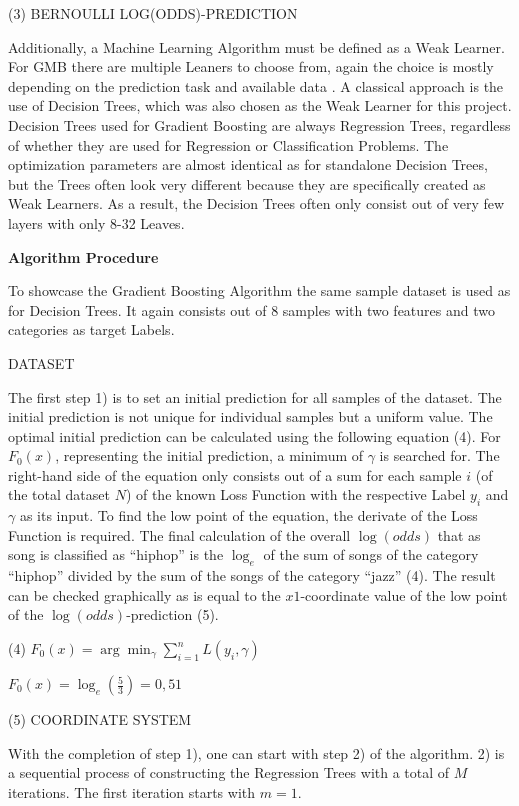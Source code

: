 (3) BERNOULLI LOG(ODDS)-PREDICTION 

Additionally, a Machine Learning Algorithm must be defined as a Weak Learner. For GMB there 
are multiple Leaners to choose from, again the choice is mostly depending on the prediction 
task and available data \cite[3.2]{Natekin2013}. A classical approach is the use of Decision Trees, which was also 
chosen as the Weak Learner for this project. Decision Trees used for Gradient Boosting are 
always Regression Trees, regardless of whether they are used for Regression or Classification 
Problems. The optimization parameters are almost identical as for standalone Decision Trees, 
but the Trees often look very different because they are specifically created as Weak Learners. 
As a result, the Decision Trees often only consist out of very few layers with only 8-32 Leaves.

\textbf{Algorithm Procedure}

To showcase the Gradient Boosting Algorithm the same sample dataset is used as for Decision Trees. 
It again consists out of 8 samples with two features and two categories as target Labels. 

DATASET 

The first step 1) is to set an initial prediction for all samples of the dataset. The initial 
prediction is not unique for individual samples but a uniform value. The optimal initial 
prediction can be calculated using the following equation (4). For \(F_{0}(x)\), representing the 
initial prediction, a minimum of \(\gamma \) is searched for. The right-hand side of the equation 
only consists out of a sum for each sample \(i\) (of the total dataset \(N\)) of the known Loss Function 
with the respective Label \(y_{i}\) and \(\gamma \) as its input. To find the low point of the equation, 
the derivate of the Loss Function is required. The final calculation of the overall \(\log (odds)\) 
that as song is classified as “hiphop” is the \(\log_{e}\) of the sum of songs of the category “hiphop” 
divided by the sum of the songs of the category “jazz” (4). The result can be checked graphically 
as is equal to the \(x1\)-coordinate value of the low point of the \(\log (odds)\)-prediction (5). 

(4) \(F_{0}(x) = \arg \min_{\gamma } \sum_{i= 1}^{n} L(y_{i}, \gamma) \)

\(F_{0}(x) = \log_{e}(\frac{5}{3}) = 0,51\)

(5) COORDINATE SYSTEM

With the completion of step 1), one can start with step 2) of the algorithm. 2) is a sequential 
process of constructing the Regression Trees with a total of \(M\) iterations. The first iteration 
starts with \(m = 1\). 

